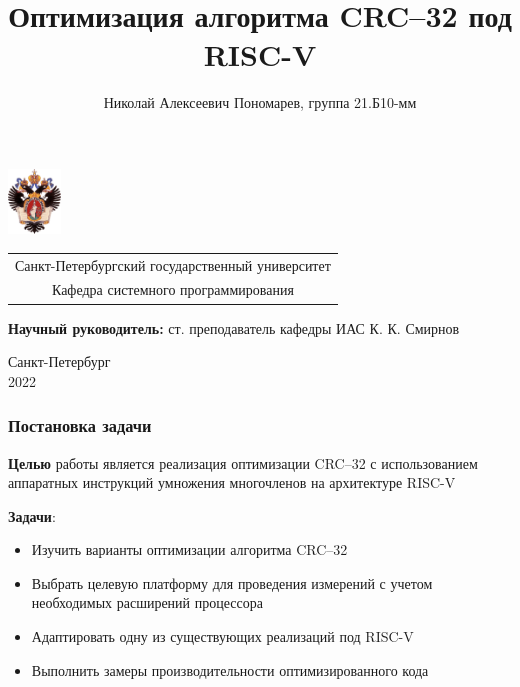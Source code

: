 \documentclass[aspectratio=169]{beamer}
\title[Оптимизация CRC--32]{Оптимизация алгоритма CRC--32 под RISC-V}
\institute[СПбГУ]{}
\author[Николай Пономарев]{Николай Алексеевич Пономарев, группа 21.Б10-мм}
\begin{document}
{
\begin{frame}
  \includegraphics[width=1.4cm]{pictures/SPbGU_Logo.png}
  \vspace{-35pt}
  \hspace{-10pt}
  \begin{center}
    \begin{tabular}{c}
      \scriptsize{Санкт-Петербургский государственный университет} \\
      \scriptsize{Кафедра системного программирования}
    \end{tabular}
    \titlepage
  \end{center}

  \btVFill

  {\scriptsize
    {\bfseries Научный руководитель:} ст. преподаватель кафедры ИАС К. К. Смирнов \\
  }
  \begin{center}
    \vspace{5pt}
    \scriptsize{Санкт-Петербург\\
      2022}
  \end{center}

\end{frame}
}


\begin{frame}
  \frametitle{Постановка задачи}
  \textbf{Целью} работы является реализация оптимизации CRC--32 с использованием аппаратных инструкций умножения многочленов на архитектуре RISC-V

  \textbf{Задачи}:
  \begin{itemize}
    \item Изучить варианты оптимизации алгоритма CRC--32
    \item Выбрать целевую платформу для проведения измерений с учетом необходимых расширений процессора
    \item Адаптировать одну из существующих реализаций под RISC-V
    \item Выполнить замеры производительности оптимизированного кода
  \end{itemize}
\end{frame}
\end{document}
